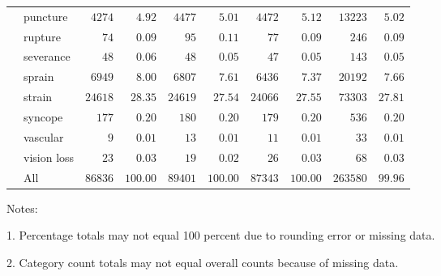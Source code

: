 \documentclass[9pt, oneside]{article}   	%
\begin{document}
\begin{longtable}{p{1.8in}p{2.2in}cccccccc}
 & puncture  & $\phantom{0}4274$ & $\phantom{00}4.92$ & $\phantom{0}4477$ & $\phantom{00}5.01$ & $\phantom{0}4472$ & $\phantom{00}5.12$ & $\phantom{0}13223$ & $\phantom{0}5.02$ \\
 & rupture  & $\phantom{000}74$ & $\phantom{00}0.09$ & $\phantom{000}95$ & $\phantom{00}0.11$ & $\phantom{000}77$ & $\phantom{00}0.09$ & $\phantom{000}246$ & $\phantom{0}0.09$ \\
 & severance  & $\phantom{000}48$ & $\phantom{00}0.06$ & $\phantom{000}48$ & $\phantom{00}0.05$ & $\phantom{000}47$ & $\phantom{00}0.05$ & $\phantom{000}143$ & $\phantom{0}0.05$ \\
 & sprain  & $\phantom{0}6949$ & $\phantom{00}8.00$ & $\phantom{0}6807$ & $\phantom{00}7.61$ & $\phantom{0}6436$ & $\phantom{00}7.37$ & $\phantom{0}20192$ & $\phantom{0}7.66$ \\
 & strain  & $24618$ & $\phantom{0}28.35$ & $24619$ & $\phantom{0}27.54$ & $24066$ & $\phantom{0}27.55$ & $\phantom{0}73303$ & $27.81$ \\
 & syncope  & $\phantom{00}177$ & $\phantom{00}0.20$ & $\phantom{00}180$ & $\phantom{00}0.20$ & $\phantom{00}179$ & $\phantom{00}0.20$ & $\phantom{000}536$ & $\phantom{0}0.20$ \\
 & vascular  & $\phantom{0000}9$ & $\phantom{00}0.01$ & $\phantom{000}13$ & $\phantom{00}0.01$ & $\phantom{000}11$ & $\phantom{00}0.01$ & $\phantom{0000}33$ & $\phantom{0}0.01$ \\
 & vision loss  & $\phantom{000}23$ & $\phantom{00}0.03$ & $\phantom{000}19$ & $\phantom{00}0.02$ & $\phantom{000}26$ & $\phantom{00}0.03$ & $\phantom{0000}68$ & $\phantom{0}0.03$ \\
\cline{1-1} \cline{2-2} \cline{3-3} \cline{4-4} \cline{5-5} \cline{6-6} \cline{7-7} \cline{8-8} \cline{9-9} \cline{10-10} %
 & All  & $86836$ & $100.00$ & $89401$ & $100.00$ & $87343$ & $100.00$ & $263580$ & $99.96$ \\
\hline 
\end{longtable}


    \begin{tablenotes}
      \small
      Notes:
      \\
      \item 1. Percentage totals may not equal 100 percent due to rounding error or missing data.\\
      \item 2. Category count totals may not equal overall counts because of missing data.
      \end{tablenotes}
\end{document}
